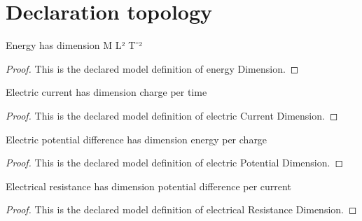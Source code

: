 \section{Declaration topology}
\begin{definition}
  \label{def:physics:phyx-mini-0928:phyxminiproblems-problemphyxmini0928-energydimension}
  Energy has dimension M L² T⁻²
\end{definition}
\begin{proof}
  This is the declared model definition of energy Dimension.
\end{proof}
\begin{definition}
  \label{def:physics:phyx-mini-0928:phyxminiproblems-problemphyxmini0928-electriccurrentdimension}
  Electric current has dimension charge per time
\end{definition}
\begin{proof}
  This is the declared model definition of electric Current Dimension.
\end{proof}
\begin{definition}
  \label{def:physics:phyx-mini-0928:phyxminiproblems-problemphyxmini0928-electricpotentialdimension}
  Electric potential difference has dimension energy per charge
\end{definition}
\begin{proof}
  This is the declared model definition of electric Potential Dimension.
\end{proof}
\begin{definition}
  \label{def:physics:phyx-mini-0928:phyxminiproblems-problemphyxmini0928-electricalresistancedimension}
  Electrical resistance has dimension potential difference per current
\end{definition}
\begin{proof}
  This is the declared model definition of electrical Resistance Dimension.
\end{proof}

